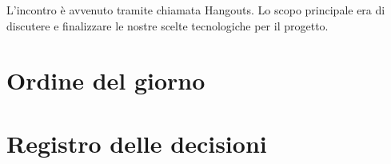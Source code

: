 \documentclass{article}
\begin{document}
L'incontro è avvenuto tramite chiamata Hangouts.
Lo scopo principale era di discutere e finalizzare le nostre scelte tecnologiche per il progetto.

\section{Ordine del giorno}%
\label{sec:ordine_del_giorno}


\newpage
\section{Registro delle decisioni}%
\label{sec:registro_delle_decisioni}


\end{document}
